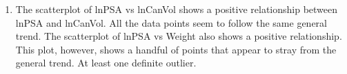 \documentclass{article}
\providecommand{\tightlist}{%
      \setlength{\itemsep}{0pt}\setlength{\parskip}{0pt}}
\begin{document}
\begin{enumerate}
\def\labelenumi{\alph{enumi})}
\tightlist
\item
  The scatterplot of lnPSA vs lnCanVol shows a positive relationship
  between lnPSA and lnCanVol. All the data points seem to follow the
  same general trend. The scatterplot of lnPSA vs Weight also shows a
  positive relationship. This plot, however, shows a handful of points
  that appear to stray from the general trend. At least one definite
  outlier.
  
  \begin{figure}[!h]
  \begin{floatrow}
  \end{floatrow}
\end{figure}
\end{enumerate}
\end{document}
